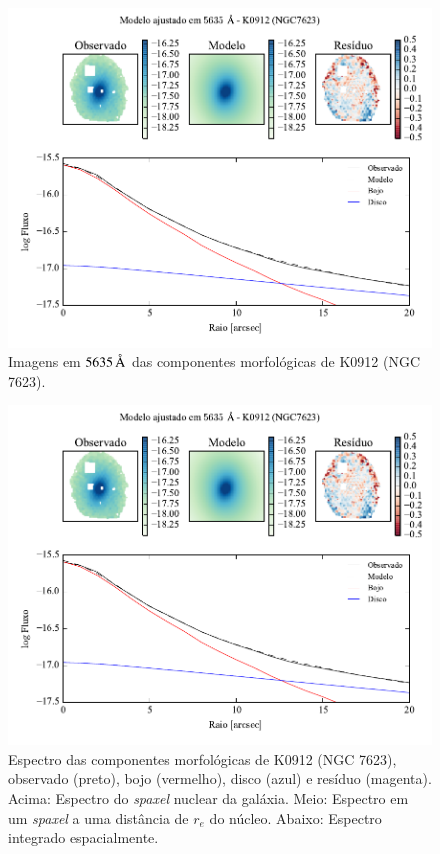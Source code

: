 \begin{figure}
	\includegraphics[page=3]{figuras-decomp/K0912_sample006a}
	\caption[Imagens em $5635\,\angstrom$ das componentes morfológicas de K0912
	(NGC 7623)]
	{Imagens em $5635\,\angstrom$ das componentes morfológicas de K0912
	(NGC 7623).}
	\label{fig:decompImages:K0912}
\end{figure}

\begin{figure}
	\includegraphics[page=4]{figuras-decomp/K0912_sample006a}
	\caption[Espectro das componentes morfológicas de K0912 (NGC 7623)]
	{Espectro das componentes morfológicas de K0912 (NGC 7623),
	observado (preto), bojo (vermelho), disco (azul) e resíduo (magenta). Acima:
	Espectro do {\em spaxel} nuclear da galáxia. Meio: Espectro em um {\em spaxel}
	a uma distância de $r_e$ do núcleo. Abaixo: Espectro integrado espacialmente.}
	\label{fig:decompSpectra:K0912}
\end{figure}

